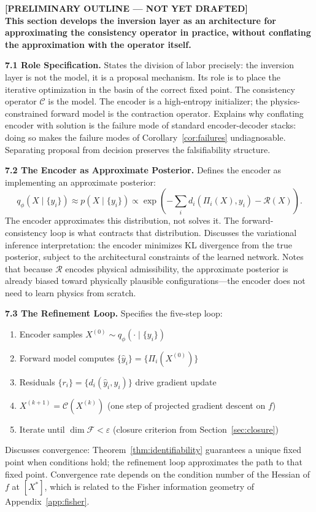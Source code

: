 \documentclass[12pt, oneside]{article}
\newcommand{\preliminary}[1]{%
  \colorbox{yellow!20}{\parbox{\dimexpr\linewidth-2\fboxsep}{%
    \textbf{\textcolor{red!70!black}{[PRELIMINARY OUTLINE --- NOT YET DRAFTED]}}\\[4pt]
    #1
  }}%
}
\begin{document}
\preliminary{
\textbf{This section develops the inversion layer as an architecture for approximating the
consistency operator in practice, without conflating the approximation with the operator
itself.}

\medskip
\textbf{7.1 Role Specification.}
States the division of labor precisely: the inversion layer is not the model, it is a
proposal mechanism. Its role is to place the iterative optimization in the basin of the
correct fixed point. The consistency operator $\mathcal{C}$ is the model. The encoder is
a high-entropy initializer; the physics-constrained forward model is the contraction
operator. Explains why conflating encoder with solution is the failure mode of standard
encoder-decoder stacks: doing so makes the failure modes of Corollary~\ref{cor:failures}
undiagnosable. Separating proposal from decision preserves the falsifiability structure.

\medskip
\textbf{7.2 The Encoder as Approximate Posterior.}
Defines the encoder as implementing an approximate posterior:
\[
q_\phi(X \mid \{y_i\}) \approx p(X \mid \{y_i\}) \propto
\exp\!\left(-\sum_i d_i(\Pi_i(X), y_i) - \mathcal{R}(X)\right).
\]
The encoder approximates this distribution, not solves it. The forward-consistency loop
is what contracts that distribution. Discusses the variational inference interpretation:
the encoder minimizes KL divergence from the true posterior, subject to the architectural
constraints of the learned network. Notes that because $\mathcal{R}$ encodes physical
admissibility, the approximate posterior is already biased toward physically plausible
configurations---the encoder does not need to learn physics from scratch.

\medskip
\textbf{7.3 The Refinement Loop.}
Specifies the five-step loop:
\begin{enumerate}
\item Encoder samples $X^{(0)} \sim q_\phi(\cdot \mid \{y_i\})$
\item Forward model computes $\{\hat{y}_i\} = \{\Pi_i(X^{(0)})\}$
\item Residuals $\{r_i\} = \{d_i(\hat{y}_i, y_i)\}$ drive gradient update
\item $X^{(k+1)} = \mathcal{C}(X^{(k)})$ (one step of projected gradient descent on $f$)
\item Iterate until $\dim \mathcal{F} < \varepsilon$ (closure criterion from
  Section~\ref{sec:closure})
\end{enumerate}
Discusses convergence: Theorem~\ref{thm:identifiability} guarantees a unique fixed point
when conditions hold; the refinement loop approximates the path to that fixed point.
Convergence rate depends on the condition number of the Hessian of $f$ at $[X^*]$, which
is related to the Fisher information geometry of Appendix~\ref{app:fisher}.

}
\end{document}
